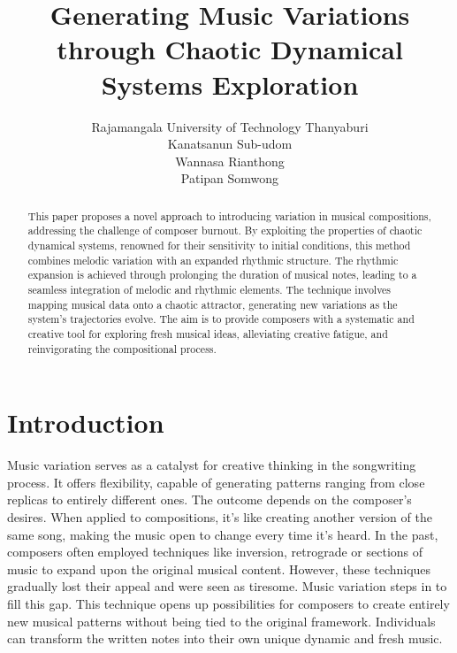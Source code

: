\documentclass[11pt]{article}
\title{Generating Music Variations through Chaotic Dynamical Systems Exploration}
\author{Rajamangala University of Technology Thanyaburi\\Kanatsanun Sub-udom\\Wannasa Rianthong\\Patipan Somwong}
\theoremstyle{definition}
\begin{document}
\maketitle
\begin{abstract}
This paper proposes a novel approach to introducing variation in musical compositions, addressing the challenge of composer burnout. 
By exploiting the properties of chaotic dynamical systems, renowned for their sensitivity to initial conditions, this method combines melodic variation with an expanded rhythmic structure. 
The rhythmic expansion is achieved through prolonging the duration of musical notes, leading to a seamless integration of melodic and rhythmic elements. 
The technique involves mapping musical data onto a chaotic attractor, generating new variations as the system's trajectories evolve. 
The aim is to provide composers with a systematic and creative tool for exploring fresh musical ideas, alleviating creative fatigue, and reinvigorating the compositional process.
\end{abstract}

\section{Introduction}
Music variation serves as a catalyst for creative thinking in the songwriting process. It offers flexibility, capable of generating patterns ranging from close replicas to entirely different ones. The outcome depends on the composer's desires. When applied to compositions, it's like creating another version of the same song, making the music open to change every time it's heard. In the past, composers often employed techniques like inversion, retrograde or sections of music to expand upon the original musical content. However, these techniques gradually lost their appeal and were seen as tiresome. Music variation steps in to fill this gap. This technique opens up possibilities for composers to create entirely new musical patterns without being tied to the original framework. Individuals can transform the written notes into their own unique dynamic and fresh music.
\end{document}
